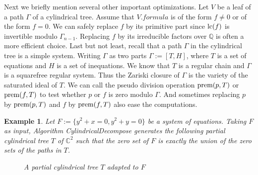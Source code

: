 \documentclass[10pt]{article}
\def\C {\ensuremath{\mathbb{C}}}
\def\Q {\ensuremath{\mathbb{Q}}}
\newtheorem{Example}{Example}
\newcommand{\lc}[1]{\mbox{{\rm lc}$(#1)$}}
\newcommand{\prem}[1]{\mbox{{\rm prem}$(#1)$}}
\begin{document}
Next we briefly mention several other important optimizations.
Let $V$ be a leaf of a path $\Gamma$ of a cylindrical tree. 
Assume that $V.formula$ is of the form $f\neq 0$ or of  the form  $f=0$.
We can safely replace $f$ by its primitive part since $\lc{f}$
is invertible modulo $\Gamma_{n-1}$. 
Replacing $f$ by its irreducible factors over $\Q$ is often a 
more efficient choice.
Last but not least,
recall that a path $\Gamma$ in the cylindrical tree is a simple system.
Writing $\Gamma$ as two parts $\Gamma := [T, H]$, where $T$ is 
a set of equations and $H$ is a set of inequations. 
We know that $T$ is a regular chain and $\Gamma$ is a squarefree regular system. 
Thus the Zariski closure of $\Gamma$ is the variety of the saturated ideal of $T$.
We can call the pseudo division operation $\prem{p, T}$ or $\prem{f, T}$
to test whether $p$ or $f$ is zero modulo $\Gamma$. 
And sometimes replacing $p$ by $\prem{p, T}$ and $f$ by $\prem{f, T}$
also ease the computations.

\begin{Example}
Let $F:= \{y^2+x=0, y^2+y=0\}$ be a system of equations. 
Taking $F$ as input, Algorithm {\sf CylindricalDecompose} generates the 
following partial cylindrical tree $T$ of $\C^2$ such that the zero set of $F$
is exactly the union of the zero sets of the paths in $T$.
\begin{figure}[htbp]
\begin{center}
\caption{A partial cylindrical tree $T$ adapted to $F$}
\label{fig:tree-eqs}
\end{center}
\end{figure}
\end{Example}
\end{document}
